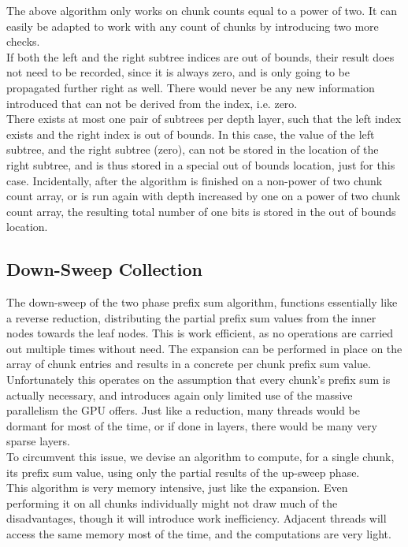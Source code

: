 \documentclass{tudscrreprt}
\begin{document}
				The above algorithm only works on chunk counts equal to a power of two. It can easily be adapted to work with any count of chunks by introducing two more checks. \\
				If both the left and the right subtree indices are out of bounds, their result does not need to be recorded, since it is always zero, and is only going to be propagated further right as well. There would never be any new information introduced that can not be derived from the index, i.e. zero. \\
				There exists at most one pair of subtrees per depth layer, such that the left index exists and the right index is out of bounds. In this case, the value of the left subtree, and the right subtree (zero), can not be stored in the location of the right subtree, and is thus stored in a special out of bounds location, just for this case. Incidentally, after the algorithm is finished on a non-power of two chunk count array, or is run again with depth increased by one on a power of two chunk count array, the resulting total number of one bits is stored in the out of bounds location. \\
			
			\subsection{Down-Sweep Collection}
				\label{sec:analysis_pss_down_sweep}
				The down-sweep of the two phase prefix sum algorithm, functions essentially like a reverse reduction, distributing the partial prefix sum values from the inner nodes towards the leaf nodes. This is work efficient, as no operations are carried out multiple times without need. The expansion can be performed in place on the array of chunk entries and results in a concrete per chunk prefix sum value. \\
				Unfortunately this operates on the assumption that every chunk's prefix sum is actually necessary, and introduces again only limited use of the massive parallelism the GPU offers. Just like a reduction, many threads would be dormant for most of the time, or if done in layers, there would be many very sparse layers. \\
				
				To circumvent this issue, we devise an algorithm to compute, for a single chunk, its prefix sum value, using only the partial results of the up-sweep phase. \\
				This algorithm is very memory intensive, just like the expansion. Even performing it on all chunks individually might not draw much of the disadvantages, though it will introduce work inefficiency. Adjacent threads will access the same memory most of the time, and the computations are very light. \\
				
\end{document}
